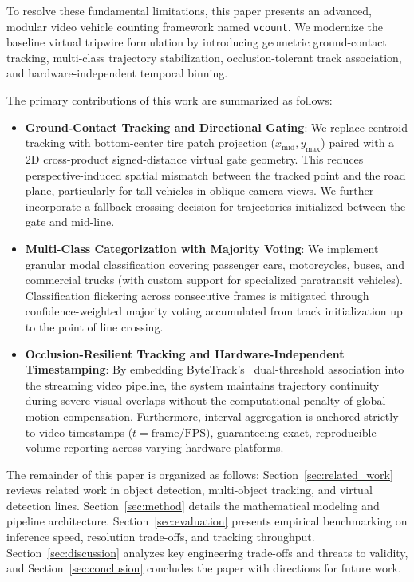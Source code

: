 To resolve these fundamental limitations, this paper presents an advanced, modular video vehicle counting framework named \texttt{vcount}. We modernize the baseline virtual tripwire formulation by introducing geometric ground-contact tracking, multi-class trajectory stabilization, occlusion-tolerant track association, and hardware-independent temporal binning.

The primary contributions of this work are summarized as follows:
\begin{itemize}
    \item \textbf{Ground-Contact Tracking and Directional Gating}: We replace centroid tracking with bottom-center tire patch projection ($x_{\text{mid}}, y_{\text{max}}$) paired with a 2D cross-product signed-distance virtual gate geometry. This reduces perspective-induced spatial mismatch between the tracked point and the road plane, particularly for tall vehicles in oblique camera views. We further incorporate a fallback crossing decision for trajectories initialized between the gate and mid-line.
    \item \textbf{Multi-Class Categorization with Majority Voting}: We implement granular modal classification covering passenger cars, motorcycles, buses, and commercial trucks (with custom support for specialized paratransit vehicles). Classification flickering across consecutive frames is mitigated through confidence-weighted majority voting accumulated from track initialization up to the point of line crossing.
    \item \textbf{Occlusion-Resilient Tracking and Hardware-Independent Timestamping}: By embedding ByteTrack's~\cite{zhang2022bytetrack} dual-threshold association into the streaming video pipeline, the system maintains trajectory continuity during severe visual overlaps without the computational penalty of global motion compensation. Furthermore, interval aggregation is anchored strictly to video timestamps ($t = \text{frame} / \text{FPS}$), guaranteeing exact, reproducible volume reporting across varying hardware platforms.
\end{itemize}

The remainder of this paper is organized as follows: Section~\ref{sec:related_work} reviews related work in object detection, multi-object tracking, and virtual detection lines. Section~\ref{sec:method} details the mathematical modeling and pipeline architecture. Section~\ref{sec:evaluation} presents empirical benchmarking on inference speed, resolution trade-offs, and tracking throughput. Section~\ref{sec:discussion} analyzes key engineering trade-offs and threats to validity, and Section~\ref{sec:conclusion} concludes the paper with directions for future work.
